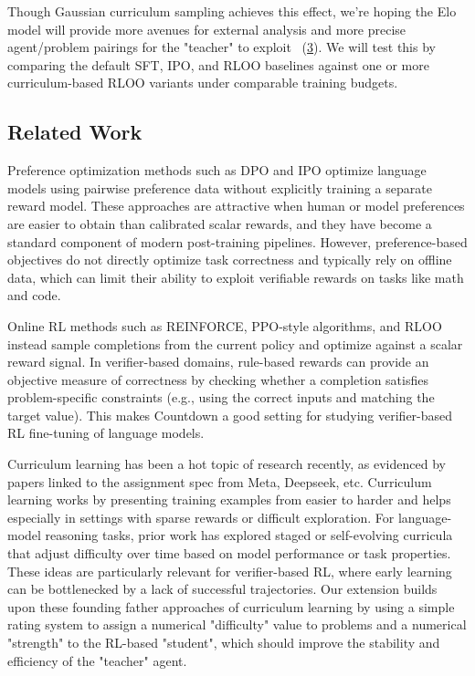 \documentclass[11pt]{article}
\begin{document}
Though Gaussian curriculum sampling achieves this effect, we're hoping the Elo model will provide more avenues for external analysis and more precise agent/problem pairings for the "teacher" to exploit ~(\hyperlink{paper:t_s}{3}). We will test this by comparing the default SFT, IPO, and RLOO baselines against one or more curriculum-based RLOO variants under comparable training budgets.

\subsection{Related Work}

Preference optimization methods such as DPO and IPO optimize language models using pairwise preference data without explicitly training a separate reward model. These approaches are attractive when human or model preferences are easier to obtain than calibrated scalar rewards, and they have become a standard component of modern post-training pipelines. However, preference-based objectives do not directly optimize task correctness and typically rely on offline data, which can limit their ability to exploit verifiable rewards on tasks like math and code.

Online RL methods such as REINFORCE, PPO-style algorithms, and RLOO instead sample completions from the current policy and optimize against a scalar reward signal. In verifier-based domains, rule-based rewards can provide an objective measure of correctness by checking whether a completion satisfies problem-specific constraints (e.g., using the correct inputs and matching the target value). This makes Countdown a good setting for studying verifier-based RL fine-tuning of language models.

Curriculum learning has been a hot topic of research recently, as evidenced by papers linked to the assignment spec from Meta, Deepseek, etc. Curriculum learning works by presenting training examples from easier to harder and helps especially in settings with sparse rewards or difficult exploration. For language-model reasoning tasks, prior work has explored staged or self-evolving curricula that adjust difficulty over time based on model performance or task properties. These ideas are particularly relevant for verifier-based RL, where early learning can be bottlenecked by a lack of successful trajectories. Our extension builds upon these founding father approaches of curriculum learning by using a simple rating system to assign a numerical "difficulty" value to problems and a numerical "strength" to the RL-based "student", which should improve the stability and efficiency of the "teacher" agent.
\end{document}
